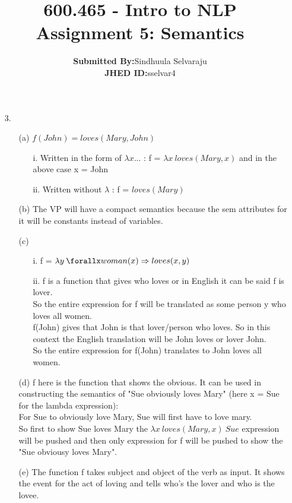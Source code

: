\documentclass{article}
\title{600.465 - Intro to NLP\\Assignment 5: Semantics}
\author{\textbf{Submitted By:}Sindhuula Selvaraju\\\textbf{JHED ID:}sselvar4}
\begin{document}
\maketitle

\begin{enumerate}
    \item[3.]
    \begin{enumerate}
        \item[(a)]$f(John) = loves(Mary,John)$ 
        \begin{enumerate}
            \item[i.] Written in the form of $\lambda x...$ : f = $\lambda x \: loves(Mary, x)$ and in the above case x = John
             \item[ii.] Written without $\lambda$ : f = $loves(Mary)$
        \end{enumerate}
        \item[(b)]The VP will have a compact semantics because the sem attributes for it will be constants instead of variables. 
        \item[(c)] 
        \begin{enumerate}
            \item[i.] f = $\lambda y \: \forallx woman(x) \Rightarrow loves(x,y)$
            \item[ii.] f is a function that gives who loves or in English it can be said f is lover. 
            \\So the entire expression for f will be translated as some person y who loves all women.
            \\f(John) gives that John is that lover/person who loves. So in this context the English translation will be John loves or lover John.
            \\So the entire expression for f(John) translates to John loves all women.
        \end{enumerate}
        \item[(d)]f here is the function that shows the obvious. It can be used in constructing the semantics of "Sue obviously loves Mary" (here x = Sue for the lambda expression):
        \\For Sue to obviously love Mary, Sue will first have to love mary.
        \\So first to show Sue loves Mary the $\lambda x \: loves(Mary,x) \:Sue$ expression will be pushed and then only expression for f will be pushed to show the "Sue obviousy loves Mary".
        \item[(e)]The function f takes subject and object of the verb as input. It shows the event for the act of loving and tells who's the lover and who is the lovee.

\end{enumerate}
\end{enumerate}
\end{document}
